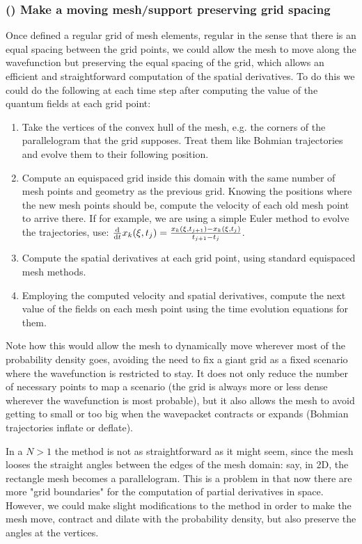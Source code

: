 \documentclass[11pt, a4paper]{article} %
\begin{document}
\subsubsection*{\bf (\textbeta) Make a moving mesh/support preserving grid spacing}
Once defined a regular grid of mesh elements, regular in the sense that there is an equal spacing between the grid points, we could allow the mesh to move along the wavefunction but preserving the equal spacing of the grid, which allows an efficient and straightforward computation of the spatial derivatives. To do this we could do the following at each time step after computing the value of the quantum fields at each grid point:
\begin{enumerate}
\item Take the vertices of the convex hull of the mesh, e.g. the corners of the parallelogram that the grid supposes. Treat them like Bohmian trajectories and evolve them to their following position.
\item Compute an equispaced grid inside this domain with the same number of mesh points and geometry as the previous grid. Knowing the positions where the new mesh points should be, compute the velocity of each old mesh point to arrive there. If for example, we are using a simple Euler method to evolve the trajectories, use: $\dv{}{t}x_k(\xi,t_{j})=\frac{x_k(\xi,t_{j+1})-x_k(\xi,t_{j})}{t_{j+1}-t_j}$.
\item Compute the spatial derivatives at each grid point, using standard equispaced mesh methods.
\item Employing the computed velocity and spatial derivatives, compute the next value of the fields on each mesh point using the time evolution equations for them.
\end{enumerate}
Note how this would allow the mesh to dynamically move wherever most of the probability density goes, avoiding the need to fix a giant grid as a fixed scenario where the wavefunction is restricted to stay. It does not only reduce the number of necessary points to map a scenario (the grid is always more or less dense wherever the wavefunction is most probable), but it also allows the mesh to avoid getting to small or too big when the wavepacket contracts or expands (Bohmian trajectories inflate or deflate). 
 
In a $N>1$ the method is not as straightforward as it might seem, since the mesh looses the straight angles between the edges of the mesh domain: say, in 2D, the rectangle mesh becomes a parallelogram. This is a problem in that now there are more "grid boundaries" for the computation of partial derivatives in space. However, we could make slight modifications to the method in order to make the mesh move, contract and dilate with the probability density, but also preserve the angles at the vertices.
\end{document}
